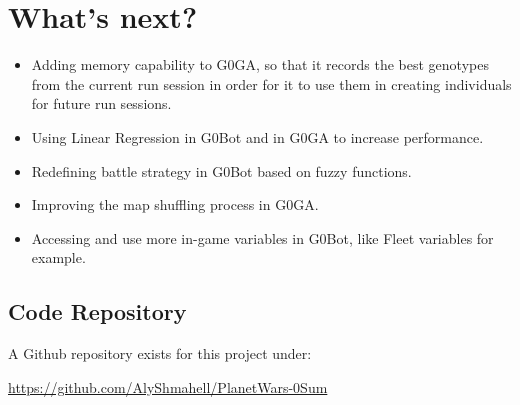 \documentclass[12pt]{report}
\begin{document}
	\section{What's next?}
	\begin{itemize}
		\item Adding memory capability to G0GA, so that it records the best genotypes from the current run session in order for it to use them in creating individuals for future run sessions.
		\item Using Linear Regression in G0Bot and in G0GA to increase performance.
		\item Redefining battle strategy in G0Bot based on fuzzy functions.
		\item Improving the map shuffling process in G0GA.
		\item Accessing and use more in-game variables in G0Bot, like Fleet variables for example.
	\end{itemize}
\begin{flushleft}
	\section{\textbf{Code Repository}}
\end{flushleft}
\begin{flushleft}
	A Github repository exists for this project under:\\
\end{flushleft}
	\begin{center}
		\url{https://github.com/AlyShmahell/PlanetWars-0Sum}
	\end{center}
\end{document}
